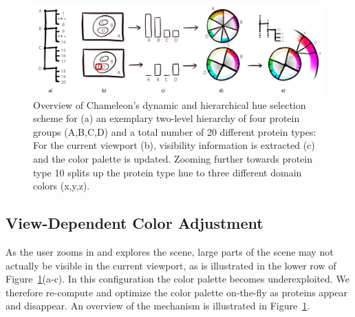 \documentclass{egpubl}
\begin{document}
	\begin{figure}[t]
		\centering
		\includegraphics[width=0.95\linewidth]{Figures/coloroverview}
		\caption{Overview of Chameleon's dynamic and hierarchical hue selection scheme for (a) an exemplary two-level hierarchy of four protein groups (A,B,C,D) and a total number of 20 different protein types: For the current viewport (b), visibility information is extracted (c) and the color palette is updated. Zooming further towards protein type 10 splits up the protein type hue to three different domain colors (x,y,z).}
		\label{fig:coloroverview}
	\end{figure}
	\subsection{View-Dependent Color Adjustment}
	\label{sec:dynamic}
	
	As the user zooms in and explores the scene, large parts of the scene may not actually be visible in the current viewport, as is illustrated in the lower row of Figure~\ref{fig:coloroverview}(a-c).
	In this configuration the color palette becomes underexploited. %
	We therefore re-compute and optimize the color palette on-the-fly as proteins appear and disappear.
	An overview of the mechanism is illustrated in Figure~\ref{fig:coloroverview}.
	
\end{document}
